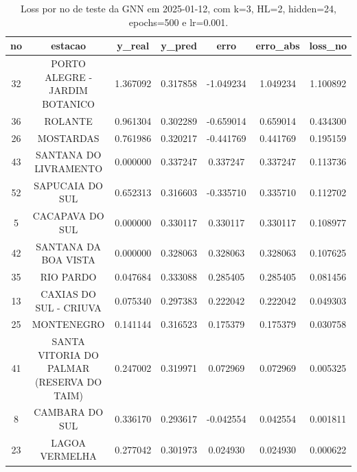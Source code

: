 \begin{table}[h]
\centering
\caption{Loss por no de teste da GNN em 2025-01-12, com k=3, HL=2, hidden=24, epochs=500 e lr=0.001.}
\label{tab:gnn_loss_k3_hl2_h24_e500_d20250112}
\begin{tabular}{ccccccc}
\toprule
no & estacao & y\_real & y\_pred & erro & erro\_abs & loss\_no \\
\midrule
32 & PORTO ALEGRE - JARDIM BOTANICO & 1.367092 & 0.317858 & -1.049234 & 1.049234 & 1.100892 \\
36 & ROLANTE & 0.961304 & 0.302289 & -0.659014 & 0.659014 & 0.434300 \\
26 & MOSTARDAS & 0.761986 & 0.320217 & -0.441769 & 0.441769 & 0.195159 \\
43 & SANTANA DO LIVRAMENTO & 0.000000 & 0.337247 & 0.337247 & 0.337247 & 0.113736 \\
52 & SAPUCAIA DO SUL & 0.652313 & 0.316603 & -0.335710 & 0.335710 & 0.112702 \\
5 & CACAPAVA DO SUL & 0.000000 & 0.330117 & 0.330117 & 0.330117 & 0.108977 \\
42 & SANTANA DA BOA VISTA & 0.000000 & 0.328063 & 0.328063 & 0.328063 & 0.107625 \\
35 & RIO PARDO & 0.047684 & 0.333088 & 0.285405 & 0.285405 & 0.081456 \\
13 & CAXIAS DO SUL - CRIUVA & 0.075340 & 0.297383 & 0.222042 & 0.222042 & 0.049303 \\
25 & MONTENEGRO & 0.141144 & 0.316523 & 0.175379 & 0.175379 & 0.030758 \\
41 & SANTA VITORIA DO PALMAR (RESERVA DO TAIM) & 0.247002 & 0.319971 & 0.072969 & 0.072969 & 0.005325 \\
8 & CAMBARA DO SUL & 0.336170 & 0.293617 & -0.042554 & 0.042554 & 0.001811 \\
23 & LAGOA VERMELHA & 0.277042 & 0.301973 & 0.024930 & 0.024930 & 0.000622 \\
\bottomrule
\end{tabular}
\end{table}
